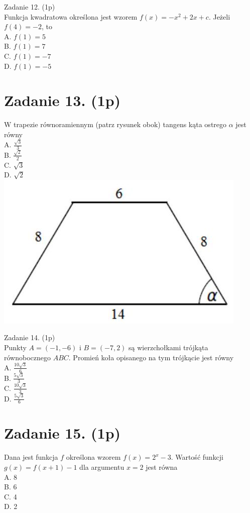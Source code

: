 \documentclass[10pt]{article}
\begin{document}
Zadanie 12. (1p)\\
Funkcja kwadratowa określona jest wzorem \(f(x)=-x^{2}+2 x+c\). Jeżeli \(f(4)=-2\), to\\
A. \(f(1)=5\)\\
B. \(f(1)=7\)\\
C. \(f(1)=-7\)\\
D. \(f(1)=-5\)

\section*{Zadanie 13. (1p)}
W trapezie równoramiennym (patrz rysunek obok) tangens kąta ostrego \(\alpha\) jest równy\\
A. \(\frac{\sqrt{3}}{3}\)\\
B. \(\frac{\sqrt{2}}{2}\)\\
C. \(\sqrt{3}\)\\
D. \(\sqrt{2}\)\\
\includegraphics[max width=\textwidth, center]{2024_11_21_9d761ca624f0efee99a4g-04}

Zadanie 14. (1p)\\
Punkty \(A=(-1,-6)\) i \(B=(-7,2)\) są wierzchołkami trójkąta równobocznego \(A B C\). Promień koła opisanego na tym trójkącie jest równy\\
A. \(\frac{10 \sqrt{3}}{6}\)\\
B. \(\frac{5 \sqrt{3}}{3}\)\\
C. \(\frac{10 \sqrt{3}}{3}\)\\
D. \(\frac{5 \sqrt{3}}{6}\)

\section*{Zadanie 15. (1p)}
Dana jest funkcja \(f\) określona wzorem \(f(x)=2^{x}-3\). Wartość funkcji \(g(x)=f(x+1)-1\) dla argumentu \(x=2\) jest równa\\
A. 8\\
B. 6\\
C. 4\\
D. 2
\end{document}
